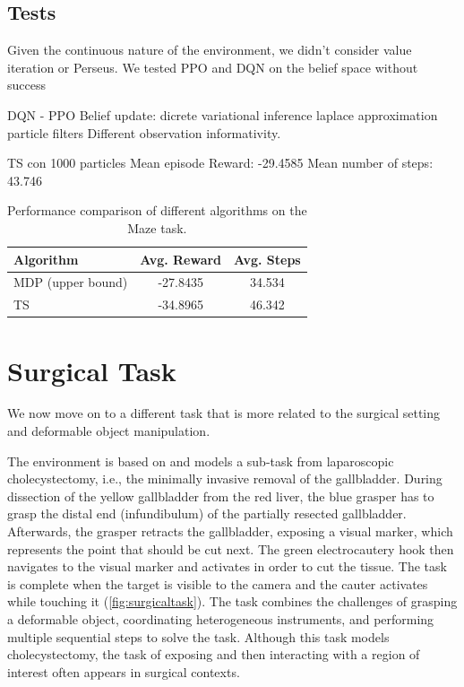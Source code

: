\subsection{Tests}

Given the continuous nature of the environment, we didn't consider value iteration or 
Perseus. We tested PPO and DQN on the belief space without success

DQN - PPO 
Belief update: dicrete variational inference laplace approximation particle filters 
Different observation informativity.

TS con 1000 particles
Mean episode Reward:  -29.4585
Mean number of steps:  43.746

\begin{table}[h]
    \centering
    \begin{tabular}{lcc}
    \toprule
    \textbf{Algorithm} & \textbf{Avg. Reward} & \textbf{Avg. Steps} \\
    \midrule
    MDP (upper bound) & -27.8435 & 34.534 \\
    TS & -34.8965 & 46.342    \\
    \bottomrule
    \end{tabular}
    \caption{Performance comparison of different algorithms on the Maze task.}
    \label{tab:maze_results}
\end{table}
    

\section{Surgical Task}
We now move on to a different task that is more related to the surgical setting and
deformable object manipulation.


The environment is based on \cite{10.5555/3648699.3649067} and models a sub-task from laparoscopic cholecystectomy, i.e., 
the minimally invasive removal of the gallbladder. 
During dissection of the yellow gallbladder from the red liver, the blue
grasper has to grasp the distal end (infundibulum) of the partially 
resected gallbladder. Afterwards, the grasper retracts the gallbladder,
exposing a visual marker, which represents the point that should be
cut next. The green electrocautery hook then navigates to the visual
marker and activates in order to cut the tissue. The task is complete
when the target is visible to the camera and the cauter activates while
touching it (\cref{fig:surgicaltask}).
The task combines the challenges of grasping a deformable object, coordinating 
heterogeneous instruments, and performing multiple sequential steps to solve the task. Although
this task models cholecystectomy, the task of exposing
and then interacting with a region of interest often appears in surgical contexts.

